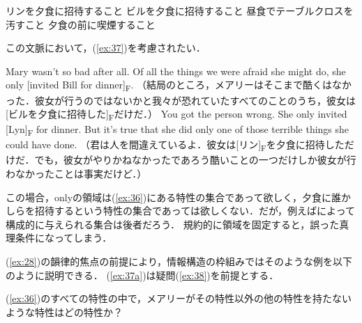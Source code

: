 \documentclass{goken}
\begin{document}
\begin{exe}
	\ex\label{ex:36}
  \begin{xlist}
    \ex\label{ex:36a} リンを夕食に招待すること
    \ex\label{ex:36b} ビルを夕食に招待すること
    \ex\label{ex:36c} 昼食でテーブルクロスを汚すこと
    \ex\label{ex:36d} 夕食の前に喫煙すること
  \end{xlist}
\end{exe}

\noindent
この文脈において，(\ref{ex:37})を考慮されたい．

\begin{exe}
	\ex\label{ex:37}
  \begin{xlist}
	  \ex\label{ex:37a} Mary wasn't so bad after all.  Of all the things we were afraid she might do, she only [invited Bill for dinner]\textsubscript{F}.
	  （結局のところ，メアリーはそこまで酷くはなかった．彼女が行うのではないかと我々が恐れていたすべてのことのうち，彼女は[ビルを夕食に招待した]\textsubscript{F}だけだ．）
	  \ex\label{ex:37b} You got the person wrong.  She only invited [Lyn]\textsubscript{F} for dinner.  But it's true that she did only one of those terrible things she could have done.
	  （君は人を間違えているよ．彼女は[リン]\textsubscript{F}を夕食に招待しただけだ．でも，彼女がやりかねなかったであろう酷いことの一つだけしか彼女が行わなかったことは事実だけど．）
  \end{xlist}
\end{exe}

\noindent
この場合，onlyの領域は(\ref{ex:36})にある特性の集合であって欲しく，夕食に誰かしらを招待するという特性の集合であっては欲しくない．だが，例えば\citet{Rooth1985}によって構成的に与えられる集合は後者だろう．
規約的に領域を固定すると，誤った真理条件になってしまう．

(\ref{ex:28})の韻律的焦点の前提により，情報構造の枠組みではそのような例を以下のように説明できる．
(\ref{ex:37a})は疑問(\ref{ex:38})を前提とする．

\begin{exe}
	\ex\label{ex:38} (\ref{ex:36})のすべての特性の中で，メアリーがその特性以外の他の特性を持たないような特性はどの特性か？
\end{exe}
\end{document}
